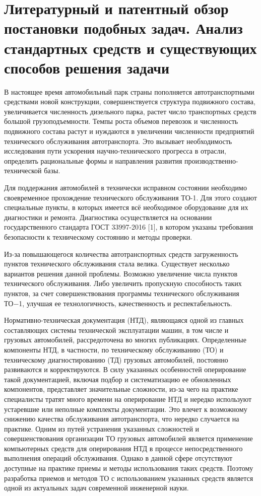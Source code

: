\section{Литературный и патентный обзор постановки подобных задач.
Анализ стандартных средств и существующих способов решения задачи}

В настоящее время автомобильный парк страны пополняется автотранспортными
средствами новой конструкции, совершенствуется структура подвижного состава,
увеличивается численность дизельного парка, растет число транспортных средств
большой грузоподъемности. Темпы роста объемов перевозок и численность подвижного
состава растут и нуждаются в увеличении численности предприятий технического
обслуживания автотранспорта. Это вызывает необходимость исследования пути
ускорения научно-технического прогресса в отрасли, определить рациональные формы
и направления развития производственно-технической базы.

Для поддержания автомобилей в технически исправном состоянии необходимо
своевременное прохождение технического обслуживания ТО-1. Для этого создают
специальные пункты, в которых имеется всё необходимое оборудование для их
диагностики и ремонта. Диагностика осуществляется на основании государственного
стандарта ГОСТ 33997-2016 [1], в котором указаны требования безопасности к
техническому состоянию и методы проверки.

Из-за повышающегося количества автотранспортных средств загруженность пунктов
технического обслуживания стала велика. Существует несколько вариантов решения
данной проблемы. Возможно увеличение числа пунктов технического обслуживания.
Либо увеличить пропускную способность таких пунктов, за счет совершенствования
программы технического обслуживания ТО−1, улучшая ее технологичность,
качественность и респектабельность.

Нормативно-техническая документация (НТД), являющаяся одной из главных
составляющих системы технической эксплуатации машин, в том числе и грузовых
автомобилей, рассредоточена во многих публикациях. Определенные компоненты НТД,
в частности, по техническому обслуживанию (ТО) и техническому диагностированию
(ТД) грузовых автомобилей, постоянно развиваются и корректируются.
В силу указанных особенностей оперирование такой документацией,
включая подбор и систематизацию ее обновленных компонентов, представляет
значительные сложности, из-за чего на практике специалисты тратят много времени
на оперирование НТД и нередко используют устаревшие или неполные комплекты
документации. Это влечет к возможному снижению качества обслуживания
автотранспорта, что нередко случается на практике.
Одним из путей устранения указанных сложностей и совершенствования организации
ТО грузовых автомобилей является применение компьютерных средств для
оперирования НТД в процессе непосредственного выполнения операций обслуживания.
Однако в данной сфере отсутствуют доступные на практике приемы и методы
использования таких средств. Поэтому разработка приемов и методов ТО с
использованием указанных средств является одной из актуальных задач современной
инженерной науки.


